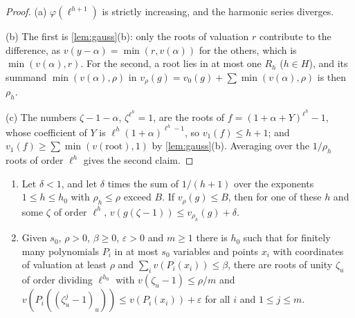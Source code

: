 \begin{proof}
(a) $\varphi(\ell^{h+1})$ is strictly increasing, and the harmonic series diverges.

(b) The first is \cref{lem:gauss}(b): only the roots of valuation $r$ contribute to the difference, as $v(y-\alpha)=\min(r,v(\alpha))$ for the others, which is $\min(v(\alpha),r)$. For the second, a root lies in at most one $R_h$ ($h\in H$), and its summand $\min(v(\alpha),\rho)$ in $v_\rho(g)=v_0(g)+\sum\min(v(\alpha),\rho)$ is then $\rho_h$.

(c) The numbers $\zeta-1-\alpha$, $\zeta^{\ell^h}=1$, are the roots of $f=(1+\alpha+Y)^{\ell^h}-1$, whose coefficient of $Y$ is $\ell^h(1+\alpha)^{\ell^h-1}$, so $v_1(f)\le h+1$; and $v_1(f)\ge\sum\min(v(\text{root}),1)$ by \cref{lem:gauss}(b). Averaging over the $1/\rho_h$ roots of order $\ell^h$ gives the second claim.
\end{proof}

\begin{proposition}\label{prop:roots-of-unity}
\begin{enumerate}[label=\textup{(\alph*)}]
\item Let $\delta<1$, and let $\delta$ times the sum of $1/(h+1)$ over the exponents $1\le h\le h_0$ with $\rho_h\le\rho$ exceed $B$. If $v_\rho(g)\le B$, then for one of these $h$ and some $\zeta$ of order $\ell^h$, $v(g(\zeta-1))\le v_{\rho_h}(g)+\delta$.
\item Given $s_0$, $\rho>0$, $\beta\ge0$, $\varepsilon>0$ and $m\ge1$ there is $h_0$ such that for finitely many polynomials $P_i$ in at most $s_0$ variables and points $x_i$ with coordinates of valuation at least $\rho$ and
$\sum_iv(P_i(x_i))\le\beta$, there are roots of unity $\zeta_u$ of order dividing $\ell^{h_0}$ with $v(\zeta_u-1)\le\rho/m$ and $v(P_i((\zeta_u^j-1)_u))\le v(P_i(x_i))+\varepsilon$ for all $i$ and $1\le j\le m$.
\end{enumerate}
\end{proposition}

